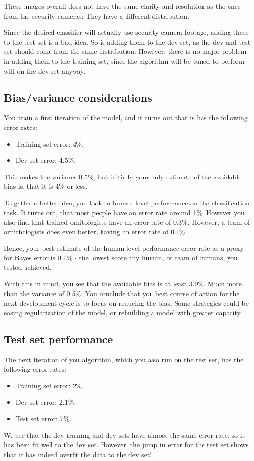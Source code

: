 \documentclass[12pt, a4paper]{article}
\numberwithin{equation}{section}
\begin{document}
These images overall does not have the same clarity and resolution as the ones from the security cameras: They have a different distribution.

Since the desired classifier will actually use security camera footage, adding these to the test set is a bad idea. So is adding them to the dev set, as the dev and test set should come from the same distribution. However, there is no major problem in adding them to the training set, since the algorithm will be tuned to perform will on the dev set anyway.

\subsection{Bias/variance considerations}
You train a first iteration of the model, and it turns out that is has the following error rates:
\begin{itemize}
\item Training set error: 4\%.
\item Dev set error: 4.5\%.
\end{itemize}
This makes the variance 0.5\%, but initially your only estimate of the avoidable bias is, that it is 4\% or less.

To getter a better idea, you look to human-level performance on the classification task. It turns out, that most people have an error rate around 1\%. However you also find that trained ornitologists have an error rate of 0.3\%. However, a team of ornithologists does even better, having an error rate of 0.1\%!

Hence, your best estimate of the human-level performance error rate as a proxy for Bayes error is 0.1\% - the lowest score any human, or team of humans, you tested achieved.

With this in mind, you see that the avoidable bias is at least 3.9\%. Much more than the variance of 0.5\%. You conclude that you best course of action for the next development cycle is to focus on reducing the bias. Some strategies could be easing regularization of the model, or rebuilding a model with greater capacity.

\subsection{Test set performance}
The next iteration of you algorithm, which you also run on the test set, has the following error rates:
\begin{itemize}
\item Training set error: 2\%.
\item Dev set error: 2.1\%.
\item Test set error: 7\%.
\end{itemize}
We see that the dev training and dev sets have almost the same error rate, so it has been fit well to the dev set. However, the jump in error for the test set shows that it has indeed overfit the data to the dev set!
\end{document}
